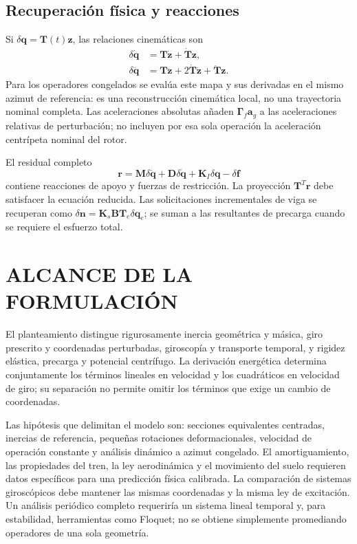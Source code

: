 \documentclass[oneside,a4paper,spanish,links,pagenumbers]{amca}
\begin{document}
\subsection{Recuperación física y reacciones}
Si $\delta\bm q=\bm T(t)\bm z$, las relaciones cinemáticas son
\begin{align}
\delta\dot{\bm q}&=\bm T\dot{\bm z}+\dot{\bm T}\bm z,\\
\delta\ddot{\bm q}&=\bm T\ddot{\bm z}
+2\dot{\bm T}\dot{\bm z}+\ddot{\bm T}\bm z.
\end{align}
Para los operadores congelados se evalúa este mapa y sus derivadas en el mismo azimut de referencia: es una reconstrucción cinemática local, no una trayectoria nominal completa. Las aceleraciones absolutas añaden $\bm\Gamma_f\bm a_g$ a las aceleraciones relativas de perturbación; no incluyen por esa sola operación la aceleración centrípeta nominal del rotor.

El residual completo
\begin{equation}
\bm r=\bm M\delta\ddot{\bm q}
+\bm D\delta\dot{\bm q}+\bm K_I\delta\bm q-\delta\bm f
\end{equation}
contiene reacciones de apoyo y fuerzas de restricción. La proyección $\bm T^T\bm r$ debe satisfacer la ecuación reducida. Las solicitaciones incrementales de viga se recuperan como $\delta\bm n=\bm K_s\bm B\bm T_e\delta\bm q_e$; se suman a las resultantes de precarga cuando se requiere el esfuerzo total.

\section{ALCANCE DE LA FORMULACIÓN}
El planteamiento distingue rigurosamente inercia geométrica y másica, giro prescrito y coordenadas perturbadas, giroscopía y transporte temporal, y rigidez elástica, precarga y potencial centrífugo. La derivación energética determina conjuntamente los términos lineales en velocidad y los cuadráticos en velocidad de giro; su separación no permite omitir los términos que exige un cambio de coordenadas.

Las hipótesis que delimitan el modelo son: secciones equivalentes centradas, inercias de referencia, pequeñas rotaciones deformacionales, velocidad de operación constante y análisis dinámico a azimut congelado. El amortiguamiento, las propiedades del tren, la ley aerodinámica y el movimiento del suelo requieren datos específicos para una predicción física calibrada. La comparación de sistemas giroscópicos debe mantener las mismas coordenadas y la misma ley de excitación. Un análisis periódico completo requeriría un sistema lineal temporal y, para estabilidad, herramientas como Floquet; no se obtiene simplemente promediando operadores de una sola geometría.
\end{document}
